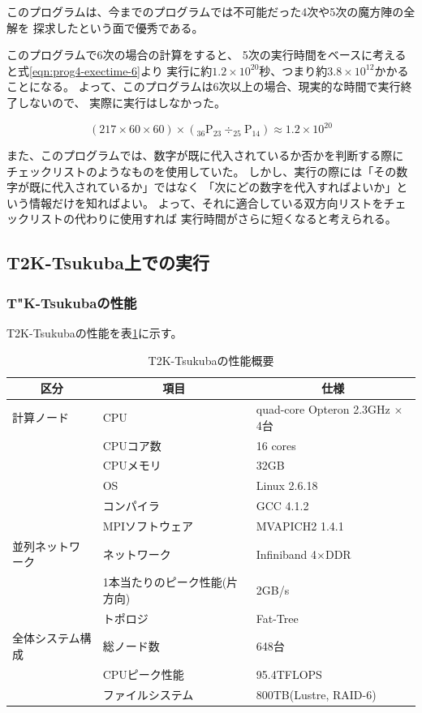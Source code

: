 このプログラムは、今までのプログラムでは不可能だった4次や5次の魔方陣の全解を
探求したという面で優秀である。

このプログラムで6次の場合の計算をすると、
5次の実行時間をベースに考えると式\ref{eqn:prog4-exectime-6}より
実行に約$1.2 \times 10^{20}$秒、つまり約$3.8 \times 10^{12}$かかることになる。
よって、このプログラムは6次以上の場合、現実的な時間で実行終了しないので、
実際に実行はしなかった。

\begin{equation} \label{eqn:prog4-exectime-6}
(217 \times 60 \times 60) \times (_{36} \mathrm{P} _{23} \div _{25} \mathrm{P} _{14}) \approx  1.2 \times 10^{20}
\end{equation}

また、このプログラムでは、数字が既に代入されているか否かを判断する際に
チェックリストのようなものを使用していた。
しかし、実行の際には「その数字が既に代入されているか」ではなく
「次にどの数字を代入すればよいか」という情報だけを知ればよい。
よって、それに適合している双方向リストをチェックリストの代わりに使用すれば
実行時間がさらに短くなると考えられる。


\subsection{T2K-Tsukuba上での実行}
\subsubsection{T"K-Tsukubaの性能}
T2K-Tsukubaの性能を表\ref{tb:t2k-perf}に示す。

\begin{table}[htb]
	\begin{center}
	\begin{tabular}{|l|l|l|}
\hline \hline
\multicolumn{1}{|c|}{区分} & \multicolumn{1}{|c|}{項目} & \multicolumn{1}{|c|}{仕様} \\
\hline \hline
計算ノード & CPU & quad-core Opteron 2.3GHz $\times$ 4台 \\
& CPUコア数 & 16 cores \\
& CPUメモリ & 32GB \\
& OS & Linux 2.6.18 \\
& コンパイラ & GCC 4.1.2 \\
& MPIソフトウェア & MVAPICH2 1.4.1 \\
\hline
並列ネットワーク & ネットワーク & Infiniband 4$\times$DDR \\
& 1本当たりのピーク性能(片方向) & 2GB/s \\
& トポロジ & Fat-Tree \\\hline
全体システム構成 & 総ノード数 & 648台 \\
& CPUピーク性能 & 95.4TFLOPS \\
& ファイルシステム & 800TB(Lustre, RAID-6) \\\hline
	\end{tabular}
	\end{center}
 	\caption{T2K-Tsukubaの性能概要}
	\label{tb:t2k-perf}
\end{table}


